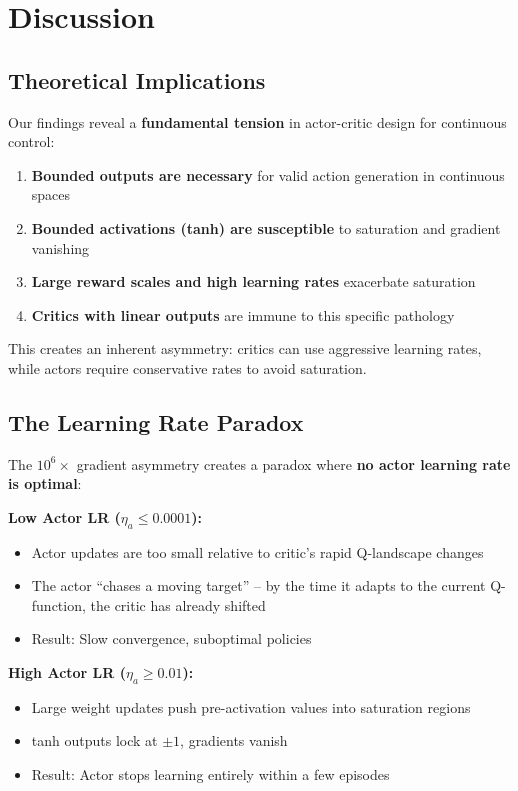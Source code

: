 \section{Discussion}
\label{sec:discussion}

\subsection{Theoretical Implications}

Our findings reveal a \textbf{fundamental tension} in actor-critic design for continuous control:

\begin{enumerate}
    \item \textbf{Bounded outputs are necessary} for valid action generation in continuous spaces
    \item \textbf{Bounded activations (tanh) are susceptible} to saturation and gradient vanishing
    \item \textbf{Large reward scales and high learning rates} exacerbate saturation
    \item \textbf{Critics with linear outputs} are immune to this specific pathology
\end{enumerate}

This creates an inherent asymmetry: critics can use aggressive learning rates, while actors require conservative rates to avoid saturation.

\subsection{The Learning Rate Paradox}

The $10^6\times$ gradient asymmetry creates a paradox where \textbf{no actor learning rate is optimal}:

\textbf{Low Actor LR ($\eta_a \leq 0.0001$):}
\begin{itemize}
    \item Actor updates are too small relative to critic's rapid Q-landscape changes
    \item The actor ``chases a moving target'' -- by the time it adapts to the current Q-function, the critic has already shifted
    \item Result: Slow convergence, suboptimal policies
\end{itemize}

\textbf{High Actor LR ($\eta_a \geq 0.01$):}
\begin{itemize}
    \item Large weight updates push pre-activation values into saturation regions
    \item tanh outputs lock at $\pm 1$, gradients vanish
    \item Result: Actor stops learning entirely within a few episodes
\end{itemize}

